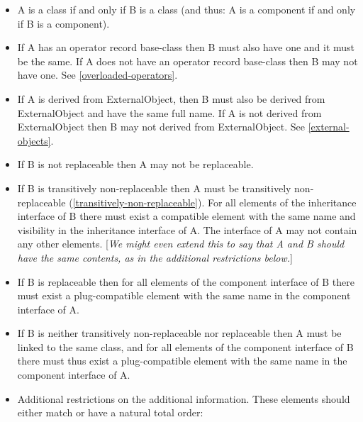 \documentclass[10pt,a4paper]{report}
\begin{document}
\begin{itemize}
\item
  A is a class if and only if B is a class (and thus: A is a component
  if and only if B is a component).
\item
  If A has an operator record base-class then B must also have one and
  it must be the same. If A does not have an operator record base-class
  then B may not have one. See \ref{overloaded-operators}.
\item
  If A is derived from ExternalObject, then B must also be derived from
  ExternalObject and have the same full name. If A is not derived from
  ExternalObject then B may not derived from ExternalObject. See 
  \ref{external-objects}.
\item
  If B is not replaceable then A may not be replaceable.
\item
  If B is transitively non-replaceable then A must be transitively
  non-replaceable (\ref{transitively-non-replaceable}). For all elements of the inheritance
  interface of B there must exist a compatible element with the same
  name and visibility in the inheritance interface of A. The interface
  of A may not contain any other elements. {[}\emph{We might even extend
  this to say that A and B should have the same contents, as in the
  additional restrictions below.}{]}
\item
  If B is replaceable then for all elements of the component interface
  of B there must exist a plug-compatible element with the same name in
  the component interface of A.
\item
  If B is neither transitively non-replaceable nor replaceable then A
  must be linked to the same class, and for all elements of the
  component interface of B there must thus exist a plug-compatible
  element with the same name in the component interface of A.
\item
  Additional restrictions on the additional information. These elements
  should either match or have a natural total order:


\end{itemize}
\end{document}

